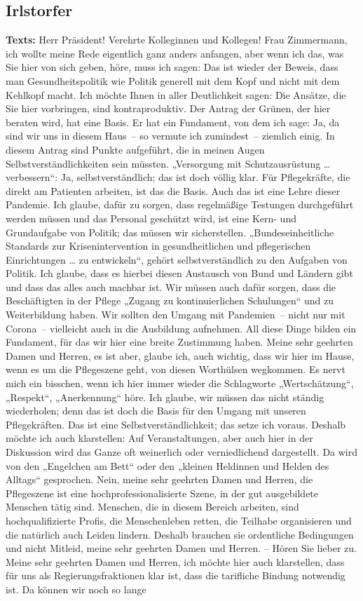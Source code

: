 \documentclass{article}
\begin{document}
\subsection{Irlstorfer}
\noindent\textbf{Texts:} Herr Präsident! Verehrte Kolleginnen und Kollegen! Frau Zimmermann, ich wollte meine Rede eigentlich ganz anders anfangen, aber wenn ich das, was Sie hier von sich geben, höre, muss ich sagen: Das ist wieder der Beweis, dass man Gesundheitspolitik wie Politik generell mit dem Kopf und nicht mit dem Kehlkopf macht.  Ich möchte Ihnen in aller Deutlichkeit sagen: Die Ansätze, die Sie hier vorbringen, sind kontraproduktiv. Der Antrag der Grünen, der hier beraten wird, hat eine Basis. Er hat ein Fundament, von dem ich sage: Ja, da sind wir uns in diesem Haus – so vermute ich zumindest – ziemlich einig. In diesem Antrag sind Punkte aufgeführt, die in meinen Augen Selbstverständlichkeiten sein müssten. „Versorgung mit Schutzausrüstung … verbessern“: Ja, selbstverständlich; das ist doch völlig klar. Für Pflegekräfte, die direkt am Patienten arbeiten, ist das die Basis. Auch das ist eine Lehre dieser Pandemie. Ich glaube, dafür zu sorgen, dass regelmäßige Testungen durchgeführt werden müssen und das Personal geschützt wird, ist eine Kern- und Grundaufgabe von Politik; das müssen wir sicherstellen. „Bundeseinheitliche Standards zur Krisenintervention in gesundheitlichen und pflegerischen Einrichtungen … zu entwickeln“, gehört selbstverständlich zu den Aufgaben von Politik. Ich glaube, dass es hierbei diesen Austausch von Bund und Ländern gibt und dass das alles auch machbar ist. Wir müssen auch dafür sorgen, dass die Beschäftigten in der Pflege „Zugang zu kontinuierlichen Schulungen“ und zu Weiterbildung haben. Wir sollten den Umgang mit Pandemien – nicht nur mit Corona – vielleicht auch in die Ausbildung aufnehmen. All diese Dinge bilden ein Fundament, für das wir hier eine breite Zustimmung haben. Meine sehr geehrten Damen und Herren, es ist aber, glaube ich, auch wichtig, dass wir hier im Hause, wenn es um die Pflegeszene geht, von diesen Worthülsen wegkommen. Es nervt mich ein bisschen, wenn ich hier immer wieder die Schlagworte „Wertschätzung“, „Respekt“, „Anerkennung“ höre. Ich glaube, wir müssen das nicht ständig wiederholen; denn das ist doch die Basis für den Umgang mit unseren Pflegekräften. Das ist eine Selbstverständlichkeit; das setze ich voraus. Deshalb möchte ich auch klarstellen: Auf Veranstaltungen, aber auch hier in der Diskussion wird das Ganze oft weinerlich oder verniedlichend dargestellt. Da wird von den „Engelchen am Bett“ oder den „kleinen Heldinnen und Helden des Alltags“ gesprochen. Nein, meine sehr geehrten Damen und Herren, die Pflegeszene ist eine hochprofessionalisierte Szene, in der gut ausgebildete Menschen tätig sind. Menschen, die in diesem Bereich arbeiten, sind hochqualifizierte Profis, die Menschenleben retten,  die Teilhabe organisieren und die natürlich auch Leiden lindern. Deshalb brauchen sie ordentliche Bedingungen und nicht Mitleid, meine sehr geehrten Damen und Herren.  – Hören Sie lieber zu.  Meine sehr geehrten Damen und Herren, ich möchte hier auch klarstellen, dass für uns als Regierungsfraktionen klar ist, dass die tarifliche Bindung notwendig ist. Da können wir noch so lange 
\end{document}
